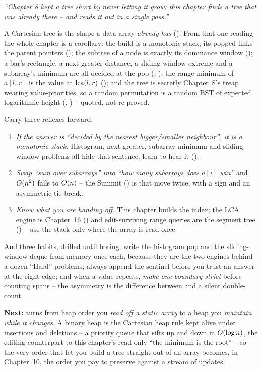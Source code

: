 \begin{lastword}
\emph{``Chapter 8 kept a tree short by never letting it grow; this chapter finds a tree that was already
there -- and reads it out in a single pass.''}

\medskip
A Cartesian tree is the shape a data array \emph{already has} (). From that one
reading the whole chapter is a corollary: the build is a monotonic stack, its popped links the parent
pointers (); the subtree of a node is exactly its dominance window
(); a bar's rectangle, a next-greater distance, a sliding-window extreme and a subarray's
minimum are all decided at the pop (, ); the range minimum of
$a[l..r]$ is the value at $\operatorname{lca}(l,r)$ (); and the tree is secretly Chapter~8's treap
wearing value-priorities, so a random permutation is a random BST of expected logarithmic height
(, ) -- quoted, not re-proved.

\medskip
Carry three reflexes forward:
\begin{enumerate}[nosep, leftmargin=1.6em]
  \item \emph{If the answer is ``decided by the nearest bigger/smaller neighbour'', it is a monotonic stack.}
        Histogram, next-greater, subarray-minimum and sliding-window problems all hide that sentence; learn
        to hear it ().
  \item \emph{Swap ``sum over subarrays'' into ``how many subarrays does $a[i]$ win''} and $O(n^2)$ falls to $O(n)$
        -- the Summit () is that move twice, with a sign and an asymmetric tie-break.
  \item \emph{Know what you are handing off.} This chapter builds the index; the LCA engine is
        Chapter~16 () and edit-surviving range queries are the segment tree () -- use
        the stack only where the array is read once.
\end{enumerate}

\medskip
And three habits, drilled until boring: write the histogram pop and the sliding-window deque from memory
once each, because they are the two engines behind a dozen ``Hard'' problems; always append the sentinel
before you trust an answer at the right edge; and when a value repeats, \emph{make one boundary strict}
before counting spans -- the asymmetry is the difference between \ac{} and a silent double-count.

\medskip
\textbf{Next:}  turns from heap order you \emph{read off a static array} to a heap you
\emph{maintain while it changes}. A binary heap is the Cartesian heap rule kept alive under insertions and
deletions -- a priority queue that sifts up and down in $O(\log n)$, the editing counterpart to this
chapter's read-only ``the minimum is the root'' -- so the very order that let you build a tree straight out
of an array becomes, in Chapter~10, the order you pay to preserve against a stream of updates.
\end{lastword}
